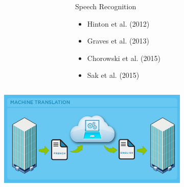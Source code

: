\documentclass{beamer}
\begin{document}
\begin{frame}
\begin{figure}
\begin{minipage}[t][7cm][t]{\textwidth}
\begin{overprint}
\begin{columns}
\begin{column}{0.6\textwidth}
\begin{figure}[ht]
								\label{fig:speechrecog}
								
							\end{figure}
						\end{column}
						\begin{column}{0.4\textwidth}
							\begin{block}{Speech Recognition}
								\begin{itemize}
									\item Hinton et al. (2012) 
									\item Graves et al. (2013)
									\item Chorowski et al. (2015)
									\item Sak et al. (2015)
								\end{itemize}
							\end{block}
						\end{column}
					\end{columns}
					\onslide<3>
					
					\begin{columns}
						\begin{column}{0.6\textwidth}
							\begin{figure}[ht]
								\centering
								\includegraphics[width=1\linewidth]{images/Mt}
								\label{fig:mt}
								

\end{figure}
\end{column}
\end{columns}
\end{overprint}
\end{minipage}
\end{figure}
\end{frame}
\end{document}
